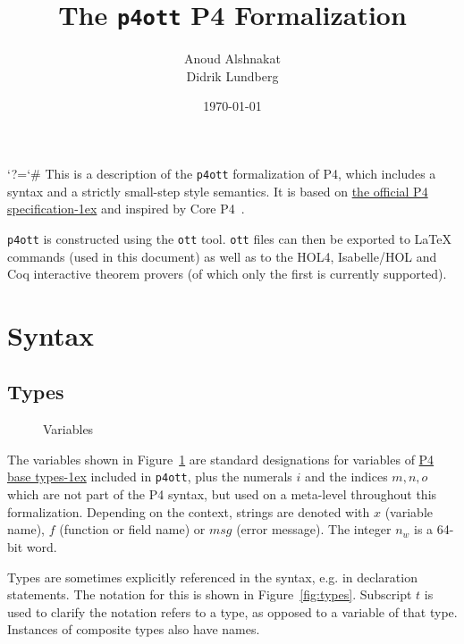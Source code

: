 \documentclass[UTF8]{article}
\title{%
The \texttt{p4ott} P4 Formalization}
\author{Anoud Alshnakat\\
Didrik Lundberg
}
\date{\today}
\begin{document}
\maketitle

\newcommand{\pfott}{\texttt{p4ott}}

\begingroup\lccode`?=`# \lowercase{\endgroup
\newcommand{\specsec}[1]{%
    ?#1%
}
}
\newcommand{\pfourspec}[2]{%
\href{https://p4lang.github.io/p4-spec/docs/P4-16-v1.2.2.html\specsec{#1}}{#2\kern-1ex} %
}
\noindent
This is a description of the \pfott{} formalization of P4, which includes a syntax and a strictly small-step style semantics. It is based on \pfourspec{}{the official P4 specification} and inspired by Core P4~\cite{doenges2021petr4}.

\pfott{} is constructed using the \texttt{ott} tool. \texttt{ott} files can then be exported to \LaTeX{} commands (used in this document) as well as to the HOL4, Isabelle/HOL and Coq interactive theorem provers (of which only the first is currently supported).

\section{Syntax}
\subsection{Types}
\newcommand{\num}{\ensuremath{i}}
\newcommand{\vn}{\ensuremath{x}}
\newcommand{\msg}{\ensuremath{\mathit{msg}}}
\newcommand{\fn}{\ensuremath{f}}
\newcommand{\inte}{\ensuremath{n_w}}
%
%
\begin{figure}[h!]
\centering
\ottmetavars
\caption{Variables}
\label{fig:vars}
\end{figure}

The variables shown in Figure~\ref{fig:vars} are standard designations for variables of \pfourspec{sec-base-types}{P4 base types} included in \pfott{}, plus the numerals \num{} and the indices $m, n, o$ which are not part of the P4 syntax, but used on a meta-level throughout this formalization. Depending on the context, strings are denoted with \vn{} (variable name), \fn{} (function or field name) or \msg{} (error message). The integer \inte{} is a 64-bit word.

Types are sometimes explicitly referenced in the syntax, e.g. in declaration statements. The notation for this is shown in Figure~\ref{fig:types}. Subscript $t$ is used to clarify the notation refers to a type, as opposed to a variable of that type. Instances of composite types also have names.
\end{document}
